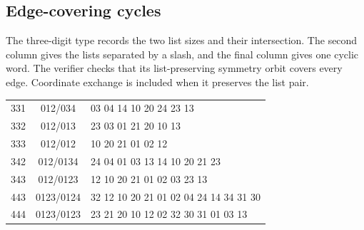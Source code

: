\documentclass[11pt]{article}
\numberwithin{equation}{section}
\numberwithin{table}{section}
\begin{document}
\subsection{Edge-covering cycles}
The three-digit type records the two list sizes and their intersection.
The second column gives the lists separated by a slash, and the final
column gives one cyclic word. The verifier checks that its list-preserving symmetry
orbit covers every edge. Coordinate exchange is included when it
preserves the list pair.
\begin{center}\small\ttfamily
\begin{tabular}{ccl}
331 & 012/034 & 03 04 14 10 20 24 23 13\\
332 & 012/013 & 23 03 01 21 20 10 13\\
333 & 012/012 & 10 20 21 01 02 12\\
342 & 012/0134 & 24 04 01 03 13 14 10 20 21 23\\
343 & 012/0123 & 12 10 20 21 01 02 03 23 13\\
443 & 0123/0124 & 32 12 10 20 21 01 02 04 24 14 34 31 30\\
444 & 0123/0123 & 23 21 20 10 12 02 32 30 31 01 03 13
\end{tabular}
\end{center}
\end{document}
